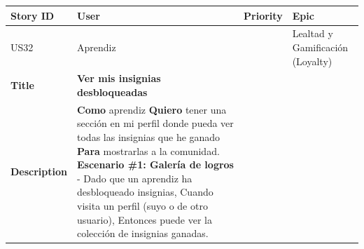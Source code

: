 {\def\LTcaptype{none} %
\begin{longtable}[]{@{}
  >{\raggedright\arraybackslash}p{}
  >{\raggedright\arraybackslash}p{}
  >{\raggedright\arraybackslash}p{}
  >{\raggedright\arraybackslash}p{}@{}}
\toprule\noalign{}
\begin{minipage}[b]{\linewidth}\raggedright
Story ID
\end{minipage} & \begin{minipage}[b]{\linewidth}\raggedright
User
\end{minipage} & \begin{minipage}[b]{\linewidth}\raggedright
Priority
\end{minipage} & \begin{minipage}[b]{\linewidth}\raggedright
Epic
\end{minipage} \\
\midrule\noalign{}
\endhead
\bottomrule\noalign{}
\endlastfoot
US32 & Aprendiz & 3 & Lealtad y Gamificación (Loyalty) \\
\textbf{Title} & \textbf{Ver mis insignias desbloqueadas} & & \\
\textbf{Description} & \textbf{Como} aprendiz \textbf{Quiero} tener una
sección en mi perfil donde pueda ver todas las insignias que he ganado
\textbf{Para} mostrarlas a la comunidad. \textbf{Escenario \#1: Galería
de logros} - Dado que un aprendiz ha desbloqueado insignias, Cuando
visita un perfil (suyo o de otro usuario), Entonces puede ver la
colección de insignias ganadas. & & \\
\end{longtable}
}

